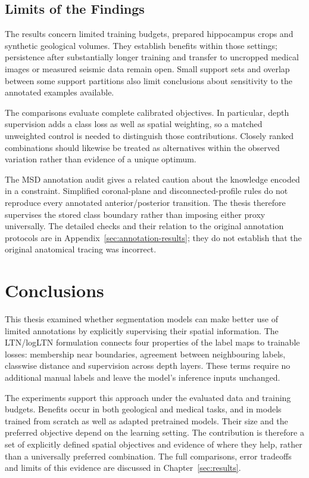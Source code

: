 \documentclass[12pt,a4paper]{article}
\begin{document}
\FloatBarrier
\subsection{Limits of the Findings}
\label{sec:limitations}\label{sec:experimental-limitations}

The results concern limited training budgets, prepared hippocampus crops
and synthetic geological volumes. They establish benefits within those
settings; persistence after substantially longer training and transfer
to uncropped medical images or measured seismic data remain open.
Small support sets and overlap between some support partitions also
limit conclusions about sensitivity to the annotated examples available.

The comparisons evaluate complete calibrated objectives. In particular,
depth supervision adds a class loss as well as spatial weighting, so
a matched unweighted control is needed to distinguish those contributions.
Closely ranked combinations should likewise be treated as alternatives
within the observed variation rather than evidence of a unique optimum.

The MSD annotation audit gives a related caution about the knowledge
encoded in a constraint. Simplified coronal-plane and disconnected-profile
rules do not reproduce every annotated anterior/posterior transition.
The thesis therefore supervises the stored class boundary rather than
imposing either proxy universally. The detailed checks and their relation
to the original annotation protocols are in
Appendix~\ref{sec:annotation-results}; they do not establish that the
original anatomical tracing was incorrect.

\clearpage

\section{Conclusions}\label{sec:conclusions}

This thesis examined whether segmentation models can make better use of
limited annotations by explicitly supervising their spatial information.
The LTN/logLTN formulation connects four properties of the label maps to
trainable losses: membership near boundaries, agreement between
neighbouring labels, classwise distance and supervision across depth
layers. These terms require no additional manual labels and leave the
model's inference inputs unchanged.

The experiments support this approach under the evaluated data and
training budgets. Benefits occur in both geological and medical tasks,
and in models trained from scratch as well as adapted pretrained models.
Their size and the preferred objective depend on the learning setting.
The contribution is therefore a set of explicitly defined spatial
objectives and evidence of where they help, rather than a universally
preferred combination. The full comparisons, error tradeoffs and limits
of this evidence are discussed in Chapter~\ref{sec:results}.
\end{document}
